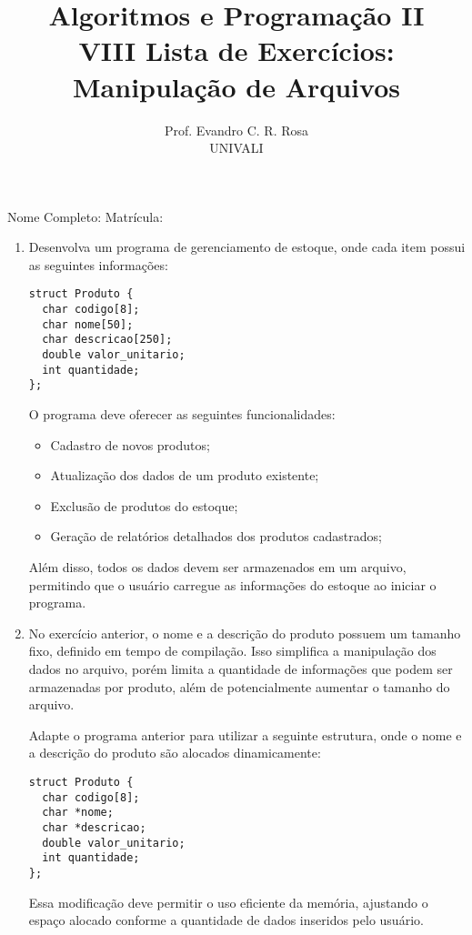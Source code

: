 \documentclass[12pt]{article}
\title{Algoritmos e Programação II\\
\large VIII Lista de Exercícios: Manipulação de Arquivos}
\author{Prof. Evandro C. R. Rosa\\UNIVALI}
\date{}
\begin{document}
\maketitle

\noindent Nome Completo: \underline{\hspace{8cm}} Matrícula: \underline{\hspace{2.4cm}}

\begin{enumerate}
  \item Desenvolva um programa de gerenciamento de estoque, onde cada item possui as seguintes informações:
    \begin{verbatim}
struct Produto {
  char codigo[8];
  char nome[50];
  char descricao[250];
  double valor_unitario;
  int quantidade;
};
    \end{verbatim}

    O programa deve oferecer as seguintes funcionalidades:
    \begin{itemize}
      \item Cadastro de novos produtos;
      \item Atualização dos dados de um produto existente;
      \item Exclusão de produtos do estoque;
      \item Geração de relatórios detalhados dos produtos cadastrados;
    \end{itemize}

    Além disso, todos os dados devem ser armazenados em um arquivo, permitindo que o usuário carregue as informações do estoque ao iniciar o programa.

  \item No exercício anterior, o nome e a descrição do produto possuem um tamanho fixo, definido em tempo de compilação. Isso simplifica a manipulação dos dados no arquivo, porém limita a quantidade de informações que podem ser armazenadas por produto, além de potencialmente aumentar o tamanho do arquivo.

    Adapte o programa anterior para utilizar a seguinte estrutura, onde o nome e a descrição do produto são alocados dinamicamente:
    \begin{verbatim}
struct Produto {
  char codigo[8];
  char *nome;
  char *descricao;
  double valor_unitario;
  int quantidade;
};
    \end{verbatim}

    Essa modificação deve permitir o uso eficiente da memória, ajustando o espaço alocado conforme a quantidade de dados inseridos pelo usuário.
\end{enumerate}
\end{document}
